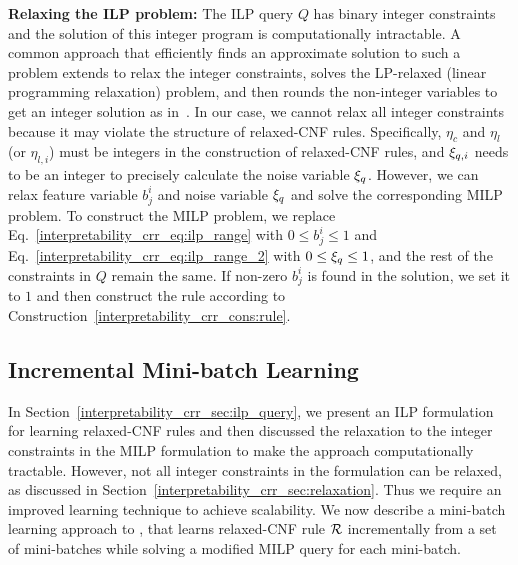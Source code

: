 \textbf{Relaxing the ILP problem:}
\label{interpretability_crr_sec:relaxation}
The ILP query $ Q $ has binary integer constraints and the solution of this integer program is computationally intractable. 
A common approach that efficiently finds an approximate solution to such a problem extends to relax the integer constraints,  solves the LP-relaxed (linear programming relaxation) problem, and then rounds the non-integer variables to get an integer solution as in~\cite{MV2013}. 
In our case, we cannot relax all integer constraints because it may violate the structure of relaxed-CNF rules. Specifically, $ \eta_c $ and $ \eta_l $ (or $ \eta_{l,i} $) must be integers in the construction of relaxed-CNF rules, and $ \xi_{q,i} $ needs to be an integer to precisely calculate the noise variable $ \xi_q $.  However,  we can relax feature variable $ b^i_j $ and noise variable $ \xi_q $ and solve the corresponding MILP  problem.  To construct the MILP problem, we replace Eq.~\ref{interpretability_crr_eq:ilp_range} with $ 0 \le b^i_j \le 1 $ and Eq.~\ref{interpretability_crr_eq:ilp_range_2} with $ 0 \le \xi_q \le 1 $, and the rest of the constraints in $ Q $ remain the same.  If non-zero $ b^i_j $ is found in the solution, we set it to $ 1 $ and then construct the rule according to Construction~\ref{interpretability_crr_cons:rule}.






	



\subsection{Incremental Mini-batch Learning}
\label{interpretability_crr_sec:inc_ilp}

In Section~\ref{interpretability_crr_sec:ilp_query}, we  present an ILP formulation for learning relaxed-CNF rules and then discussed the relaxation to the integer constraints in the MILP formulation to make the approach computationally tractable. However, not all integer constraints in the formulation can be relaxed, as discussed  in Section~\ref{interpretability_crr_sec:relaxation}. Thus we require an improved learning technique to achieve scalability. We now describe a mini-batch learning approach to {\crr}, that learns relaxed-CNF rule $ {\mathcal{R}} $ incrementally from a set of mini-batches while solving a modified MILP query for each mini-batch.



